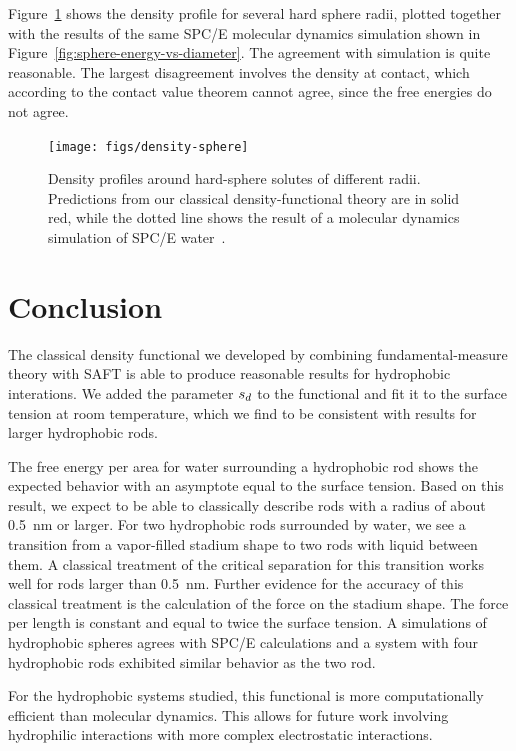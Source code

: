 \documentclass[letterpaper,twocolumn,amsmath,amssymb,prb]{revtex4-1}
\begin{document}
Figure~\ref{fig:density-sphere} shows the density profile for several
hard sphere radii, plotted together with the results of the same
SPC/E molecular dynamics simulation shown in
Figure~\ref{fig:sphere-energy-vs-diameter}\cite{huang2001shs}.  The
agreement with simulation is quite reasonable.  The largest
disagreement involves the density at contact, which according to the
contact value theorem cannot agree, since the free energies do not
agree.

\begin{figure}
\begin{center}
\texttt{[image: figs/density-sphere]}
\end{center}
\caption{ Density profiles around hard-sphere solutes of different radii. Predictions
  from our classical density-functional theory are in solid red, while
  the dotted line shows the result of a molecular dynamics simulation
  of SPC/E water~\cite{huang2001shs}.  }
\label{fig:density-sphere}
\end{figure}

\section{Conclusion}

The classical density functional we developed by combining fundamental-measure 
theory with SAFT is able to produce reasonable results for hydrophobic interations.
We added the parameter $s_d$ to the functional and fit it to the surface tension
at room temperature, which we find to be consistent with results for larger hydrophobic
rods. 

The free energy per area for water surrounding a hydrophobic rod shows the
expected behavior with an asymptote equal to the surface tension.
Based on this result, we expect to be
able to classically describe rods with a radius of about 0.5~nm or larger. 
For two hydrophobic rods surrounded by water, we see a transition from a vapor-filled
stadium shape to two rods with liquid between them. A
classical treatment of the critical separation for this transition
works well for rods larger than 0.5~nm.  Further evidence for the
accuracy of this classical treatment is the calculation of the force on the
stadium shape. The force per length is constant and equal to twice the
surface tension. A simulations of hydrophobic spheres agrees with
SPC/E calculations and a system with four hydrophobic rods exhibited
similar behavior as the two rod.

For the hydrophobic systems studied, this functional is more computationally 
efficient than molecular dynamics. This allows for future work
involving hydrophilic interactions with more complex electrostatic interactions.


\end{document}
